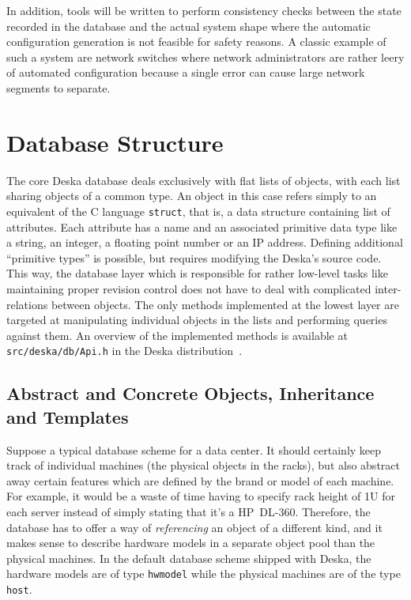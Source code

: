 \documentclass[a4paper]{jpconf}
\begin{document}
In addition, tools will be written to perform consistency checks between the state recorded in the database and the actual system
shape where the automatic configuration generation is not feasible for safety reasons.  A classic example of such a system are network
switches where network administrators are rather leery of automated configuration because a single error can cause large network
segments to separate.

\section{Database Structure}

The core Deska database deals exclusively with flat lists of objects, with each list sharing objects of a common type.  An object in this case refers simply to an
equivalent of the C language {\tt struct}, that is, a data structure containing list of attributes.  Each attribute has a name and an
associated primitive data type like a string, an integer, a floating point number or an IP address.  Defining additional ``primitive
types'' is possible, but requires modifying the Deska's source code.  This way, the database layer which is responsible for rather
low-level tasks like maintaining proper revision control does not have to deal with complicated inter-relations between objects.  The
only methods implemented at the lowest layer are targeted at manipulating individual objects in the lists and performing queries against
them.  An overview of the implemented methods is available at {\tt src/deska/db/Api.h} in the Deska distribution~\cite{deska-project}.

\subsection{Abstract and Concrete Objects, Inheritance and Templates}

Suppose a typical database scheme for a data center.  It should certainly keep track of individual machines (the physical objects in
the racks), but also abstract away certain features which are defined by the brand or model of each machine.  For example, it would be
a waste of time having to specify rack height of 1U for each server instead of simply stating that it's a HP~DL-360.  Therefore, the
database has to offer a way of {\em referencing} an object of a different kind, and it makes sense to describe hardware models in a
separate object pool than the physical machines.  In the default database scheme shipped with Deska, the hardware models are of type
{\tt hwmodel} while the physical machines are of the type {\tt host}.
\end{document}
